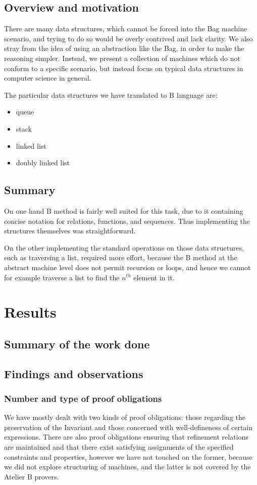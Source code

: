 \documentclass[11pt,journal]{IEEEtran}
\begin{document}
	\subsection{Overview and motivation}
	There are many data structures, which cannot be forced into the Bag machine scenario, and trying to do so would be overly contrived and lack clarity. We also stray from the idea of using an abstraction like the Bag, in order to make the reasoning simpler. Instead, we present a collection of machines which do not conform to a specific scenario, but instead focus on typical data structures in computer science in general.
	
	The particular data structures we have translated to B language are:
	\begin{itemize}
		\item queue
		\item stack
		\item linked list
		\item doubly linked list
	\end{itemize}
	
	
	\subsection{Summary}
	On one hand B method is fairly well suited for this task, due to it containing concise notation for relations, functions, and sequences. Thus implementing the structures themselves was straightforward. 
	
	On the other implementing the standard operations on those data structures, such as traversing a list, required more effort, because the B method at the abstract machine level does not permit recursion or loops, and hence we cannot for example traverse a list to find the $n^{th}$ element in it.


	\section{Results}
	\subsection{Summary of the work done}
	
	
	\subsection{Findings and observations}
	\subsubsection{Number and type of proof obligations}
	We have mostly dealt with two kinds of proof obligations: those regarding the preservation of the Invariant and those concerned with well-defineness of certain expressions. There are also proof obligations ensuring that refinement relations are maintained and that there exist satisfying assignments of the specified constraints and properties\cite{Sekerinski}, however we have not touched on the former, because we did not explore structuring of machines, and the latter is not covered by the Atelier B provers.
	
\end{document}

